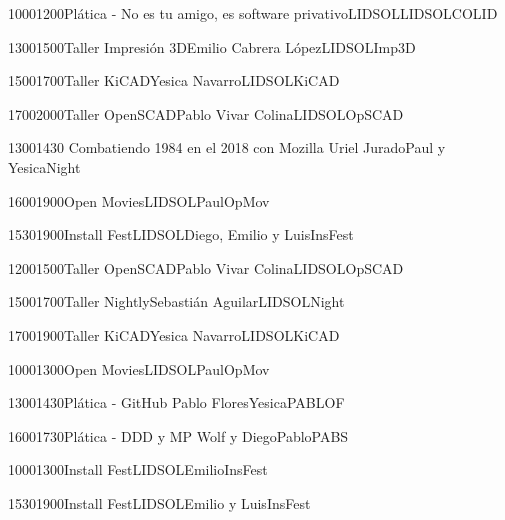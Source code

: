 \documentclass[a4paper,11pt]{article}                 %
\begin{document}
\begin{landscape}
\begin{timetable}

   \daymark{}
  \daymark{}
     \daymark{$ \mapsto$ }
  \daymark{ }
   
  
   
   
   {1000}{1200}{Pl\'{a}tica - No es tu amigo, es software privativo}{LIDSOL}{{\tiny LIDSOL}}{COLID}
  
    {1300}{1500}{Taller Impresi\'{o}n 3D}{Emilio Cabrera L\'{o}pez}{{\tiny LIDSOL}}{Imp3D}
  
     {1500}{1700}{Taller KiCAD}{Yesica Navarro}{{\tiny LIDSOL}}{KiCAD}
    
     {1700}{2000}{Taller OpenSCAD}{Pablo Vivar Colina}{{\tiny LIDSOL}}{OpSCAD}
    
    
    {1300}{1430}{ Combatiendo 1984 en el 2018 con Mozilla }{Uriel Jurado}{{\tiny Paul y Yesica}}{Night}
 
  
   {1600}{1900}{Open Movies}{LIDSOL}{{\tiny Paul}}{OpMov}
   
   
    {1530}{1900}{Install Fest}{LIDSOL}{{\tiny Diego, Emilio y Luis}}{InsFest}
   
  
  
  
   
    {1200}{1500}{Taller OpenSCAD}{Pablo Vivar Colina}{{\tiny LIDSOL}}{OpSCAD}
   
     {1500}{1700}{Taller Nightly}{Sebasti\'{a}n Aguilar}{{\tiny LIDSOL}}{Night}
    
     {1700}{1900}{Taller KiCAD}{Yesica Navarro}{{\tiny LIDSOL}}{KiCAD}
    
    
 {1000}{1300}{Open Movies}{LIDSOL}{{\tiny Paul}}{OpMov}
    
     {1300}{1430}{Pl\'{a}tica - GitHub }{Pablo Flores}{{\tiny Yesica}}{PABLOF}
   
   
    {1600}{1730}{Pl\'{a}tica - DDD y MP }{Wolf y Diego}{{\tiny Pablo}}{PABS}
 
 
  {1000}{1300}{Install Fest}{LIDSOL}{{\tiny Emilio}}{InsFest}
   
    {1530}{1900}{Install Fest}{LIDSOL}{{\tiny Emilio y Luis}}{InsFest}
   
   
   
   
 \end{timetable}
 
 
 \end{landscape}
 

  


\end{document}
